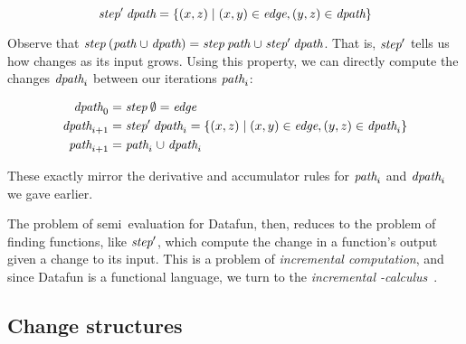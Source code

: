 \[
\text{\itshape step}' \mskip 4mu plus 4mu minus 1mu\text{\itshape dpath} =
\{(x,z) \mathrel{|} (x,y) \in \text{\itshape edge}, (y,z) \in \text{\itshape dpath}\}
\]

\noindent
Observe that $\name{step} \<(\name{path} \cup \name{dpath}) =
\name{step}\<\name{path} \cup \name{step}'\<\name{dpath}$.
%
That is, $\text{\itshape step}'$ tells us how  changes as its input grows.
%
Using this property, we can directly compute the changes $\text{\itshape dpath}_i$
between our iterations $\text{\itshape path}_i$:



\begin{align*}
  \name{dpath}_0
  &= \name{step}\<\emptyset
  = \name{edge}
  \\
  \name{dpath}_{i+1}
  &= \name{step}'\<\name{dpath}_i
  = \setfor{(x,z)}{(x,y) \in \name{edge}, (y,z) \in \name{dpath}_i}
  \\
  \name{path}_{i+1}
  &= \name{path}_i \cup \name{dpath}_i
\end{align*}

\noindent These exactly mirror the derivative and accumulator rules for
\(\text{\itshape path}_i\) and \(\text{\itshape dpath}_i\) we gave earlier.
%

The problem of semi\naive\ evaluation for Datafun, then, reduces to the problem
of finding functions, like $\text{\itshape step}'$, which compute the change in a
function's output given a change to its input.
%
This is a problem of \emph{incremental computation}, and since Datafun is a
functional language, we turn to the
\emph{incremental \fn-calculus}~\citep{incremental}.


\subsection{Change structures}
\label{sec:change-structures}

